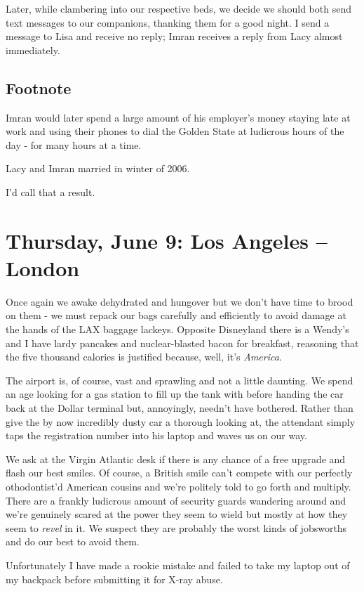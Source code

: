 \documentclass[a5paper,titlepage,11pt,draft]{book}
\begin{document}
Later, while clambering into our respective beds, we decide we should both send text messages to our companions, thanking them for a good night.  I send a message to Lisa and receive no reply; Imran receives a reply from Lacy almost immediately.

\section*{Footnote}
Imran would later spend a large amount of his employer's money staying late at work and using their phones to dial the Golden State at ludicrous hours of the day - for many hours at a time.

Lacy and Imran married in winter of 2006.

I'd call that a result.


\chapter[Los Angeles -- London]{Thursday, June 9: Los Angeles -- London}
Once again we awake dehydrated and hungover but we don't have time to brood on them - we must repack our bags carefully and efficiently to avoid damage at the hands of the LAX baggage lackeys.  Opposite Disneyland there is a Wendy's and I have lardy pancakes and nuclear-blasted bacon for breakfast, reasoning that the five thousand calories is justified because, well, it's \emph{America}.

The airport is, of course, vast and sprawling and not a little daunting.  We spend an age looking for a gas station to fill up the tank with before handing the car back at the Dollar terminal but, annoyingly, needn't have bothered.  Rather than give the by now incredibly dusty car a thorough looking at, the attendant simply taps the registration number into his laptop and waves us on our way.

We ask at the Virgin Atlantic desk if there is any chance of a free upgrade and flash our best smiles.  Of course, a British smile can't compete with our perfectly othodontist'd American cousins and we're politely told to go forth and multiply.  There are a frankly ludicrous amount of security guards wandering around and we're genuinely scared at the power they seem to wield but mostly at how they seem to \emph{revel} in it.  We suspect they are probably the worst kinds of jobsworths and do our best to avoid them.

Unfortunately I have made a rookie mistake and failed to take my laptop out of my backpack before submitting it for X-ray abuse.
\end{document}
